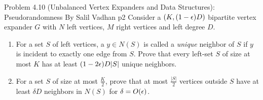 \documentclass[a4paper, 11pt]{article}
\begin{document}

\begin{problem}{%
		Problem 4.10 (Unbalanced Vertex Expanders and Data Structures): Pseudorandomness By Salil Vadhan
	}{p2%
	}
	Consider a $(K,(1-\epsilon)D)$ bipartite vertex expander $G$ with $N$ left vertices, $M$ right vertices and left degree $D$.
	\begin{enumerate}
		\item For a set $S$ of left vertices, a $y\in N(S)$ is called a \textit{unique} neighbor of $S$ if $y$ is incident to exactly one edge from $S$. Prove that every left-set $S$ of size at most $K$ has at least $(1-2\epsilon)D|S|$ unique neighbors.
		\item For a set $S$ of size at most $\frac{K}2$, prove that at most $\frac{|S|}2$ vertices outside $S$ have at least $\delta D$ neighbors in $N(S)$ for $\delta=O(\epsilon)$.
	\end{enumerate}
\end{problem}
\solve{

}

\end{document}
